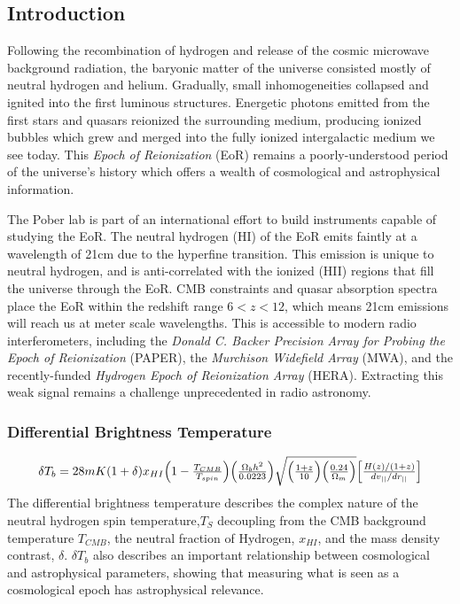 \documentclass[a0,landscape]{a0poster}
\begin{document}
\begin{multicols}{4}

\color{DarkSlateGray}  %

\section*{Introduction}
Following the recombination of hydrogen and release of the cosmic microwave background radiation, the baryonic matter of the universe consisted mostly of neutral hydrogen and helium. Gradually, small inhomogeneities collapsed and ignited into the first luminous structures. Energetic photons emitted from the first stars and quasars reionized the surrounding medium, producing ionized bubbles which grew and merged into the fully ionized intergalactic medium we see today. This \emph{Epoch of Reionization} (EoR) remains a poorly-understood period of the universe's history which offers a wealth of cosmological and astrophysical information.

The Pober lab is part of an international effort to build instruments capable of studying the EoR. The neutral hydrogen (HI) of the EoR emits faintly at a wavelength of 21cm due to the hyperfine transition. This emission is unique to neutral hydrogen, and is anti-correlated with the ionized (HII) regions that fill the universe through the EoR. CMB constraints and quasar absorption spectra place the EoR within the redshift range $6 < z < 12$, which means 21cm emissions will reach us at meter scale wavelengths. This is accessible to modern radio interferometers, including the \emph{Donald C. Backer Precision Array for Probing the Epoch of Reionization} (PAPER), the \emph{Murchison Widefield Array} (MWA), and the recently-funded \emph{Hydrogen Epoch of Reionization Array} (HERA). Extracting this weak signal remains a challenge unprecedented in radio astronomy.



\subsubsection*{Differential Brightness Temperature}
\begin{equation}
\label{difftemp}
\resizebox{.9\hsize}{!}{$
\delta T_{b} = 28mK(1+\delta)x_{HI}\Big(1-\frac{T_{CMB}}{T_{spin}}\Big)\Big(\frac{\Omega_{b}h^2}{0.0223}\Big)\sqrt{\Big(\frac{1+z}{10}\Big)\Big(\frac{0.24}{\Omega_m}\Big)}\Big[ \frac{H(z)/(1+z)}{dv_{||}/dr_{||}}\Big]$}
\end{equation}
The differential brightness temperature describes the complex nature of the neutral hydrogen spin temperature,$T_S$ decoupling from the CMB background temperature $T_{CMB}$, the neutral fraction of Hydrogen, $x_{HI}$, and the mass density contrast, $\delta$.
$\delta T_b$ also describes an important relationship between cosmological and astrophysical parameters, showing that measuring what is seen as a cosmological epoch has astrophysical relevance.


\end{multicols}
\end{document}

